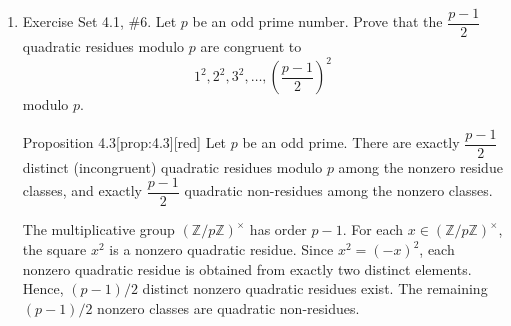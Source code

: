 \begin{enumerate}
\begin{enumerate}
    \begin{subanswer}
      Since $39=3\cdot 13$ with $\gcd(3,13)=1$, the congruence $x^2\equiv 11\pmod{39}$ is equivalent to the system $x^2\equiv 11\pmod{3}$ and $x^2\equiv 11\pmod{13}$.
      \begin{itemize}
        \item Modulo $3$, it is found that $11\equiv 2\pmod{3}$. The quadratic residues modulo $3$ are $1^2\equiv 1\pmod{3}$ only, so $x^2\equiv 2\pmod{3}$ has no solutions.
      \end{itemize}
      Since one of the congruences has no solution, the original congruence $x^2\equiv 11\pmod{39}$ has no solutions.
    \end{subanswer}
    \item $x^2 \equiv 46 \pmod{105}$.
    \begin{subanswer}
      Since $105=3\cdot 5\cdot 7$, the congruence $x^2\equiv 46\pmod{105}$ is equivalent to the system $x^2\equiv 46\pmod{3}$, $x^2\equiv 46\pmod{5}$, and $x^2\equiv 46\pmod{7}$.
      \begin{itemize}
        \item Modulo $3$, $46\equiv 1\pmod{3}$, and $x^2\equiv 1\pmod{3}$ has solutions $x\equiv 1,2\pmod{3}$.
        \item Modulo $5$, $46\equiv 1\pmod{5}$, and $x^2\equiv 1\pmod{5}$ has solutions $x\equiv 1,4\pmod{5}$.
        \item Modulo $7$, $46\equiv 4\pmod{7}$, and $x^2\equiv 4\pmod{7}$ has solutions $x\equiv 2,5\pmod{7}$.
      \end{itemize}
      By the Chinese Remainder Theorem, $2\cdot 2\cdot 2=8$ incongruent solutions modulo $105$ exist.
      \[
      x\equiv 16, 19, 26, 44, 61, 79, 86, 89 \pmod{105}.
      \]
    \end{subanswer}
  \end{enumerate}
  \item Exercise Set 4.1, \#6. Let $p$ be an odd prime number. Prove that the $\dfrac{p-1}{2}$ quadratic residues modulo $p$ are congruent to
  \[
    1^2,2^2,3^2,\ldots,\left(\frac{p-1}{2}\right)^2
  \]
  modulo $p$.
  \begin{define}{Proposition 4.3}[prop:4.3][red]
  Let $p$ be an odd prime. There are exactly $\dfrac{p-1}{2}$ distinct
  (incongruent) quadratic residues modulo $p$ among the nonzero residue
  classes, and exactly $\dfrac{p-1}{2}$ quadratic non-residues among the
  nonzero classes.
  \begin{subprove}
  The multiplicative group $(\mathbb{Z}/p\mathbb{Z})^\times$ has order $p-1$. For each $x\in(\mathbb{Z}/p\mathbb{Z})^\times$, the square $x^2$ is a nonzero quadratic residue. Since $x^2 = (-x)^2$, each nonzero quadratic residue is obtained from exactly two distinct elements. Hence, $(p-1)/2$ distinct nonzero quadratic residues exist. The remaining $(p-1)/2$ nonzero classes are quadratic non-residues.
  \end{subprove}
  \end{define}
  

\end{enumerate}
